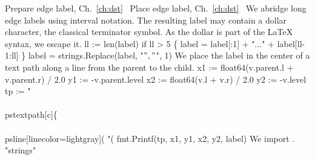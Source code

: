 \LA{}Prepare edge label, Ch.~\ref{ch:dst}~{\nwtagstyle{}}\RA{}
\LA{}Place edge label, Ch.~\ref{ch:dst}~{\nwtagstyle{}}\RA{}
\nwendcode{}\nwdocspar
We abridge long edge labels using interval notation. The resulting
label may contain a dollar character, the classical terminator
symbol. As the dollar is part of the \LaTeX{} syntax, we escape it.
\nwenddocs{}\endmoddef\nwstartdeflinemarkup{}\nwenddeflinemarkup
ll := len(label)
if ll > 5 \{
          label = label[:1] + "..." + label[ll-1:ll]
\}
label = strings.Replace(label, "$", "\\\\$", 1)
\nwendcode{}\nwdocspar
We place the label in the center of a text path along a line from the
parent to the child.
\nwenddocs{}\endmoddef\nwstartdeflinemarkup{}\nwenddeflinemarkup
x1 := float64(v.parent.l + v.parent.r) / 2.0
y1 := -v.parent.level
x2 := float64(v.l + v.r) / 2.0
y2 := -v.level
tp := "\\\\pstextpath[c]\{\\\\psline[linecolor=lightgray](%
          "(%
fmt.Printf(tp, x1, y1, x2, y2, label)
\nwendcode{}\nwdocspar
We import .
\nwenddocs{}\plusendmoddef\nwstartdeflinemarkup{}\nwenddeflinemarkup
"strings"
\nwendcode{}\nwdocspar
